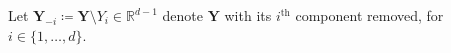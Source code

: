 \documentclass[12pt]{article}
\DeclareMathOperator{\CE}{\mathrm{CE}}
\begin{document}
Let $\symbf{Y}_{-i} \coloneq \symbf{Y} \setminus Y_i \in \mathbb{R}^{d-1}$ denote $\symbf{Y}$ with its $i^{\text{th}}$ component removed, for $i \in \{1, \ldots, d\}$.
\end{document}

